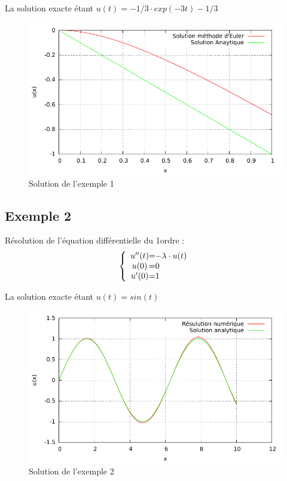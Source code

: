 \documentclass[a4paper,11pt]{article}
\begin{document}
La solution exacte étant $u(t)=-1/3\cdot exp(-3t)-1/3$
  \begin{figure}[H]
	 \begin{center}
	\includegraphics[scale=.8]{exemple1}
	\caption{Solution de l'exemple 1}
	\end{center}
      \end{figure}
\subsection{Exemple 2}
Résolution de l'équation différentielle du 1\ier ordre :
\begin{equation*}
 \left \{
  \begin{array}{c @{=} l}
    u''(t) & -\lambda \cdot u(t) 
\\
   u(0) & 0
\\
  u'(0)&1
  \end{array}
\right.
\end{equation*} 

La solution exacte étant $u(t)=sin(t)$

  \begin{figure}[H]
	 \begin{center}
	\includegraphics[scale=1]{exemple2}
	\caption{Solution de l'exemple 2}
	\end{center}
      \end{figure}
\end{document}

